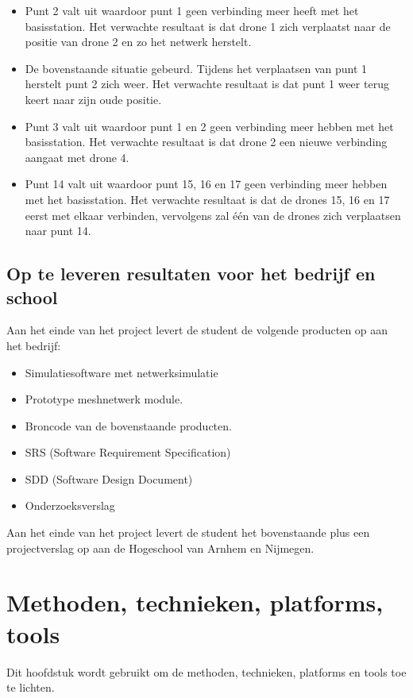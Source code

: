 \documentclass[a4paper, 11pt, oneside]{report}
\begin{document}
\begin{itemize}
	\item Punt 2 valt uit waardoor punt 1 geen verbinding meer heeft met het basisstation. Het verwachte resultaat is dat drone 1 zich verplaatst naar de positie van drone 2 en zo het netwerk herstelt.
	\item De bovenstaande situatie gebeurd. Tijdens het verplaatsen van punt 1 herstelt punt 2 zich weer. Het verwachte resultaat is dat punt 1 weer terug  keert naar zijn oude positie.
	\item Punt 3 valt uit waardoor punt 1 en 2 geen verbinding meer hebben met het basisstation. Het verwachte resultaat is dat drone 2 een nieuwe verbinding aangaat met drone 4.
	\item Punt 14 valt uit waardoor punt 15, 16 en 17 geen verbinding meer hebben met het basisstation. Het verwachte resultaat is dat de drones 15, 16 en 17 eerst met elkaar verbinden, vervolgens zal één van de drones zich verplaatsen naar punt 14. 
\end{itemize}

\section[Op te leveren resultaten]{Op te leveren resultaten voor het bedrijf en school}\label{sec:op-te-leveren-resultaten-voor-het-bedrijf-en-school}

Aan het einde van het project levert de student de volgende producten op aan het bedrijf:

\begin{itemize}
	\item Simulatiesoftware met netwerksimulatie
	\item Prototype meshnetwerk module.
	\item Broncode van de bovenstaande producten. 
	\item SRS (Software Requirement Specification)
	\item SDD (Software Design Document)
	\item Onderzoeksverslag
\end{itemize}

Aan het einde van het project levert de student het bovenstaande plus een projectverslag op aan de Hogeschool van Arnhem en Nijmegen.


\chapter{Methoden, technieken, platforms, tools}\label{sec:methoden-technieken-platforms-tools}
Dit hoofdstuk wordt gebruikt om de methoden, technieken, platforms en tools toe te lichten.
\end{document}
